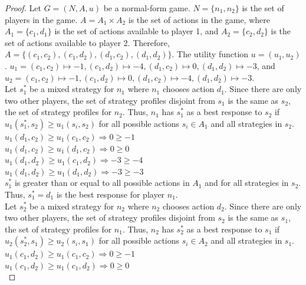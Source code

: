 \begin{proof}
  Let $G=(N, A, u)$ be a normal-form game. $N = \{n_1, n_2\}$ is the set of players in the game. $A=A_1\times A_2$ is the set of actions in the game, where $A_1=\{c_1, d_1\}$ is the set of actions available to player 1, and $A_2=\{c_2, d_2\}$ is the set of actions available to player 2. Therefore, $A=\{(c_1, c_2), (c_1, d_2), (d_1, c_2), (d_1, d_2)\}$. The utility function $u=(u_1, u_2)$. $u_1=(c_1, c_2)\mapsto -1, (c_1, d_2)\mapsto -4, (d_1, c_2)\mapsto 0, (d_1, d_2)\mapsto -3$, and $u_2=(c_1, c_2)\mapsto -1, (c_1, d_2)\mapsto 0, (d_1, c_2)\mapsto -4, (d_1, d_2)\mapsto -3$.\\

  Let $s^*_1$ be a mixed strategy for $n_1$ where $n_1$ chooses action $d_1$. Since there are only two other players, the set of strategy profiles disjoint from $s_1$ is the same as $s_2$, the set of strategy profiles for $n_2$. Thus, $n_1$ has $s^*_1$ as a best response to $s_2$ if $u_1(s^*_1, s_2)\ge u_1(s_i, s_2)$ for all possible actions $s_i\in A_1$ and all strategies in $s_2$.\\
  
  $u_1(d_1, c_2)\ge u_1(c_1, c_2) \Rightarrow 0\ge -1$\\
  
  $u_1(d_1, c_2)\ge u_1(d_1, c_2) \Rightarrow 0\ge 0$\\

  $u_1(d_1, d_2)\ge u_1(c_1, d_2) \Rightarrow -3\ge -4$\\

  $u_1(d_1, d_2)\ge u_1(d_1, d_2) \Rightarrow -3\ge -3$\\

  $s^*_1$ is greater than or equal to all possible actions in $A_1$ and for all strategies in $s_2$. Thus, $s^*_1=d_1$ is the best response for player $n_1$.\\

  Let $s^*_2$ be a mixed strategy for $n_2$ where $n_2$ chooses action $d_2$. Since there are only two other players, the set of strategy profiles disjoint from $s_2$ is the same as $s_1$, the set of strategy profiles for $n_1$. Thus, $n_2$ has $s^*_2$ as a best response to $s_1$ if $u_2(s^*_2, s_1)\ge u_2(s_i, s_1)$ for all possible actions $s_i\in A_2$ and all strategies in $s_1$.\\
  
  $u_1(c_1, d_2)\ge u_1(c_1, c_2) \Rightarrow 0\ge -1$\\

  $u_1(c_1, d_2)\ge u_1(c_1, d_2) \Rightarrow 0\ge 0$\\


\end{proof}
